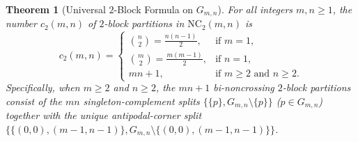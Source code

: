 \documentclass[11pt]{article}
\theoremstyle{plain}
\newtheorem{theorem}{Theorem}[section]
\theoremstyle{definition}
\newcommand{\NC}{\mathrm{NC}}
\begin{document}
\begin{theorem}[Universal $2$-Block Formula on $G_{m,n}$]\label{thm:c2-universal}
For all integers $m, n \ge 1$, the number $c_2(m, n)$ of $2$-block partitions in $\NC_2(m, n)$ is
\begin{equation}\label{eq:c2-formula}
  c_2(m, n) = \begin{cases}
    \binom{n}{2} = \frac{n(n-1)}{2}, & \text{if } m = 1, \\[3pt]
    \binom{m}{2} = \frac{m(m-1)}{2}, & \text{if } n = 1, \\[3pt]
    mn + 1, & \text{if } m \ge 2 \text{ and } n \ge 2.
  \end{cases}
\end{equation}
Specifically, when $m \ge 2$ and $n \ge 2$, the $mn + 1$ bi-noncrossing $2$-block partitions consist of the $mn$ singleton-complement splits $\{\{p\}, G_{m,n} \setminus \{p\}\}$ ($p \in G_{m,n}$) together with the unique antipodal-corner split $\{\{(0,0), (m-1, n-1)\}, G_{m,n} \setminus \{(0,0), (m-1, n-1)\}\}$.
\end{theorem}
\end{document}
